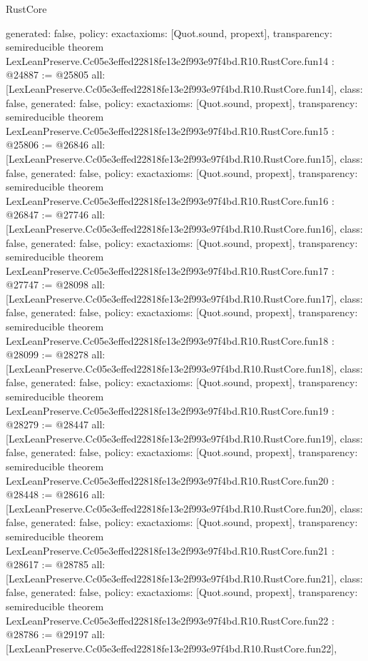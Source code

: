 \begin{lexlean}{RustCore}
\begin{coremodule}
{  generated: false,
  policy: exact{axioms: [Quot.sound, propext]},
  transparency: semireducible
}
theorem LexLeanPreserve.Cc05e3effed22818fe13e2f993e97f4bd.R10.RustCore.fun14 : @24887 := @25805 {
  all: [LexLeanPreserve.Cc05e3effed22818fe13e2f993e97f4bd.R10.RustCore.fun14],
  class: false,
  generated: false,
  policy: exact{axioms: [Quot.sound, propext]},
  transparency: semireducible
}
theorem LexLeanPreserve.Cc05e3effed22818fe13e2f993e97f4bd.R10.RustCore.fun15 : @25806 := @26846 {
  all: [LexLeanPreserve.Cc05e3effed22818fe13e2f993e97f4bd.R10.RustCore.fun15],
  class: false,
  generated: false,
  policy: exact{axioms: [Quot.sound, propext]},
  transparency: semireducible
}
theorem LexLeanPreserve.Cc05e3effed22818fe13e2f993e97f4bd.R10.RustCore.fun16 : @26847 := @27746 {
  all: [LexLeanPreserve.Cc05e3effed22818fe13e2f993e97f4bd.R10.RustCore.fun16],
  class: false,
  generated: false,
  policy: exact{axioms: [Quot.sound, propext]},
  transparency: semireducible
}
theorem LexLeanPreserve.Cc05e3effed22818fe13e2f993e97f4bd.R10.RustCore.fun17 : @27747 := @28098 {
  all: [LexLeanPreserve.Cc05e3effed22818fe13e2f993e97f4bd.R10.RustCore.fun17],
  class: false,
  generated: false,
  policy: exact{axioms: [Quot.sound, propext]},
  transparency: semireducible
}
theorem LexLeanPreserve.Cc05e3effed22818fe13e2f993e97f4bd.R10.RustCore.fun18 : @28099 := @28278 {
  all: [LexLeanPreserve.Cc05e3effed22818fe13e2f993e97f4bd.R10.RustCore.fun18],
  class: false,
  generated: false,
  policy: exact{axioms: [Quot.sound, propext]},
  transparency: semireducible
}
theorem LexLeanPreserve.Cc05e3effed22818fe13e2f993e97f4bd.R10.RustCore.fun19 : @28279 := @28447 {
  all: [LexLeanPreserve.Cc05e3effed22818fe13e2f993e97f4bd.R10.RustCore.fun19],
  class: false,
  generated: false,
  policy: exact{axioms: [Quot.sound, propext]},
  transparency: semireducible
}
theorem LexLeanPreserve.Cc05e3effed22818fe13e2f993e97f4bd.R10.RustCore.fun20 : @28448 := @28616 {
  all: [LexLeanPreserve.Cc05e3effed22818fe13e2f993e97f4bd.R10.RustCore.fun20],
  class: false,
  generated: false,
  policy: exact{axioms: [Quot.sound, propext]},
  transparency: semireducible
}
theorem LexLeanPreserve.Cc05e3effed22818fe13e2f993e97f4bd.R10.RustCore.fun21 : @28617 := @28785 {
  all: [LexLeanPreserve.Cc05e3effed22818fe13e2f993e97f4bd.R10.RustCore.fun21],
  class: false,
  generated: false,
  policy: exact{axioms: [Quot.sound, propext]},
  transparency: semireducible
}
theorem LexLeanPreserve.Cc05e3effed22818fe13e2f993e97f4bd.R10.RustCore.fun22 : @28786 := @29197 {
  all: [LexLeanPreserve.Cc05e3effed22818fe13e2f993e97f4bd.R10.RustCore.fun22],
}
\end{coremodule}
\end{lexlean}
